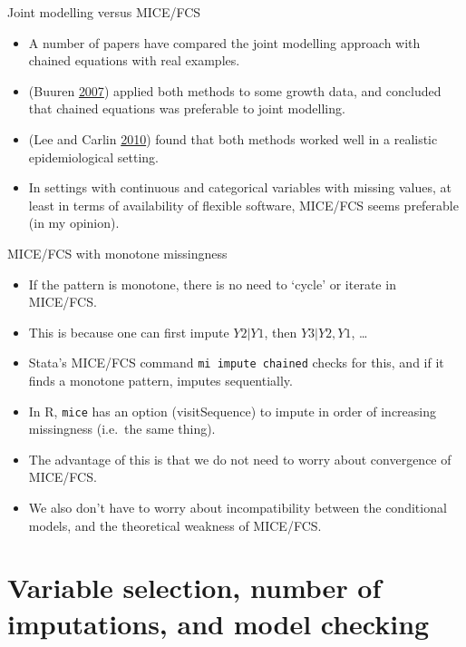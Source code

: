 \documentclass[ignorenonframetext,]{beamer}
\providecommand{\tightlist}{%
  \setlength{\itemsep}{0pt}\setlength{\parskip}{0pt}}
\begin{document}
\begin{frame}{Joint modelling versus MICE/FCS}
\protect\hypertarget{joint-modelling-versus-micefcs}{}

\begin{itemize}
\tightlist
\item
  A number of papers have compared the joint modelling approach with
  chained equations with real examples.
\item
  (Buuren \protect\hyperlink{ref-Buuren:2007}{2007}) applied both
  methods to some growth data, and concluded that chained equations was
  preferable to joint modelling.
\item
  (Lee and Carlin \protect\hyperlink{ref-Leeux2fCarlin:2010}{2010})
  found that both methods worked well in a realistic epidemiological
  setting.
\item
  In settings with continuous and categorical variables with missing
  values, at least in terms of availability of flexible software,
  MICE/FCS seems preferable (in my opinion).
\end{itemize}

\end{frame}

\begin{frame}[fragile]{MICE/FCS with monotone missingness}
\protect\hypertarget{micefcs-with-monotone-missingness}{}

\begin{itemize}
\tightlist
\item
  If the pattern is monotone, there is no need to `cycle' or iterate in
  MICE/FCS.
\item
  This is because one can first impute \(Y2|Y1\), then \(Y3|Y2,Y1\),
  \ldots{}
\item
  Stata's MICE/FCS command \texttt{mi\ impute\ chained} checks for this,
  and if it finds a monotone pattern, imputes sequentially.
\item
  In R, \texttt{mice} has an option (visitSequence) to impute in order
  of increasing missingness (i.e.~the same thing).
\item
  The advantage of this is that we do not need to worry about
  convergence of MICE/FCS.
\item
  We also don't have to worry about incompatibility between the
  conditional models, and the theoretical weakness of MICE/FCS.
\end{itemize}

\end{frame}

\hypertarget{variable-selection-number-of-imputations-and-model-checking}{%
\section{Variable selection, number of imputations, and model
checking}\label{variable-selection-number-of-imputations-and-model-checking}}
\end{document}
